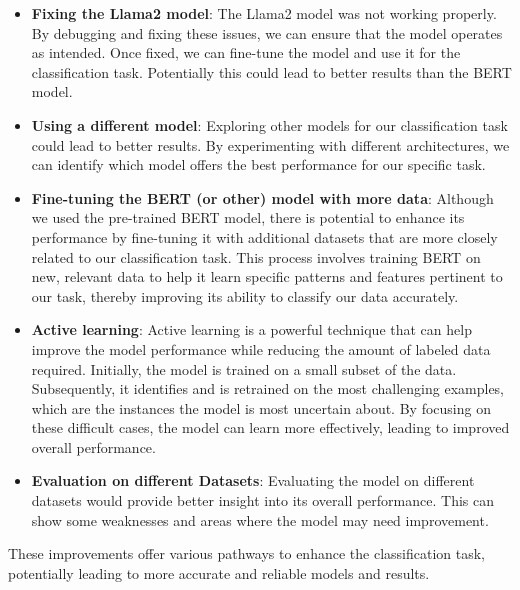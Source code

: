 \documentclass[fleqn,moreauthors,10pt]{ds_report}
\begin{document}
\begin{itemize}
    \item \textbf{Fixing the Llama2 model}: The Llama2 model was not working properly. By debugging and fixing these issues, we can ensure that the model operates as intended. Once fixed, we can fine-tune the model and use it for the classification task. Potentially this could lead to better results than the BERT model.
    
    \item \textbf{Using a different model}: Exploring other models for our classification task could lead to better results. By experimenting with different architectures, we can identify which model offers the best performance for our specific task.
    
    \item \textbf{Fine-tuning the BERT (or other) model with more data}: Although we used the pre-trained BERT model, there is potential to enhance its performance by fine-tuning it with additional datasets that are more closely related to our classification task. This process involves training BERT on new, relevant data to help it learn specific patterns and features pertinent to our task, thereby improving its ability to classify our data accurately.
    
    \item \textbf{Active learning}: Active learning is a powerful technique that can help improve the model performance while reducing the amount of labeled data required. Initially, the model is trained on a small subset of the data. Subsequently, it identifies and is retrained on the most challenging examples, which are the instances the model is most uncertain about. By focusing on these difficult cases, the model can learn more effectively, leading to improved overall performance.
    \item \textbf{Evaluation on different Datasets}: Evaluating the model on different datasets would provide better insight into its overall performance. This can show some weaknesses and areas where the model may need improvement.
\end{itemize}

These improvements offer various pathways to enhance the classification task, potentially leading to more accurate and reliable models and results.




\end{document}
